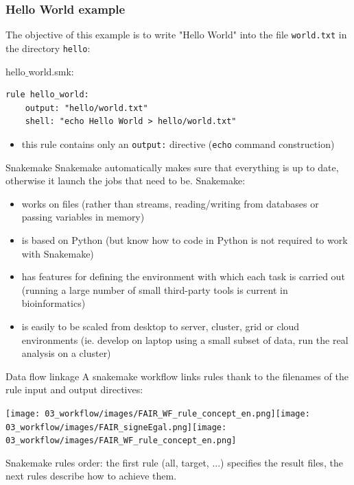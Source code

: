 \begin{frame}[containsverbatim]
\frametitle{Hello World example}
The objective of this example is to write "Hello World" into the file \verb|world.txt| in the directory \verb|hello|:
\begin{block}{hello$\_$world.smk:}
\begin{lstlisting}
rule hello_world:
    output: "hello/world.txt"
    shell: "echo Hello World > hello/world.txt"
\end{lstlisting}
\end{block}
\begin{itemize}
    \item this rule contains only an \verb|output:| directive (\verb|echo| command construction)
\end{itemize}
\end{frame}
\begin{frame}{Snakemake}
Snakemake automatically makes sure that everything is up to date, otherwise it launch the jobs that need to be.
\vfill
Snakemake:
\begin{itemize}
    \item works on files (rather than streams, reading/writing from databases or passing variables in memory)
    \item is based on Python (but know how to code in Python is not required to work with Snakemake)
    \item has features for defining the environment with which each task is carried out (running a large number of small third-party tools is current in bioinformatics)
    \item is easily to be scaled from desktop to server, cluster, grid or cloud environments (ie. develop on laptop using a small subset of data, run the real analysis on a cluster)
\end{itemize}    
\end{frame}
\begin{frame}{Data flow linkage}
A snakemake workflow links rules thank to the filenames of the rule input and output directives:
\begin{center}
    \texttt{[image: 03\_workflow/images/FAIR\_WF\_rule\_concept\_en.png]}\texttt{[image: 03\_workflow/images/FAIR\_signeEgal.png]}\texttt{[image: 03\_workflow/images/FAIR\_WF\_rule\_concept\_en.png]}
\end{center}
\begin{block}{Snakemake rules order:}
   the first rule (all, target, ...) specifies the result files, the next rules describe how to achieve them.
\end{block}
\end{frame}
